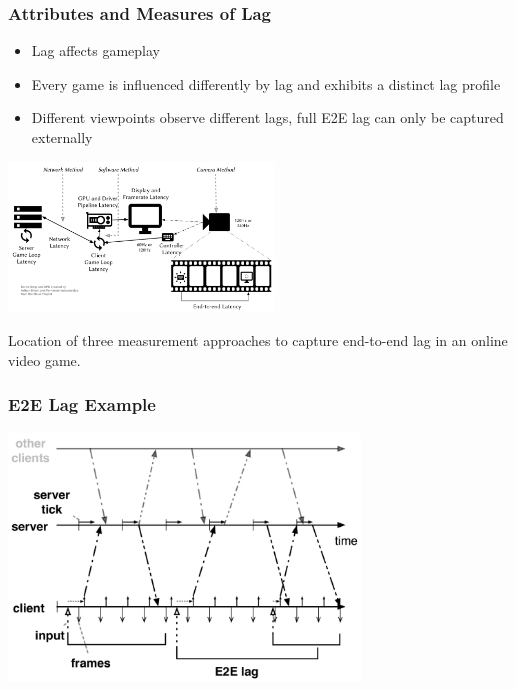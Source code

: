 \documentclass{UDEbeamerEN}
\begin{document}
\begin{frame}
	\frametitle{Attributes and Measures of Lag}

	\begin{itemize}
		\item Lag affects gameplay
		\item Every game is influenced differently by lag and exhibits a distinct lag profile
		\item Different viewpoints observe different lags, full E2E lag can only be captured externally
	\end{itemize}

	\begin{center}
		\includegraphics[height=4cm]{../../../models/e2e-lag.pdf}

	    Location of three measurement approaches to capture end-to-end lag in an online video game.
	\end{center}

\end{frame}

\begin{frame}
	\frametitle{E2E Lag Example}

	\begin{center}
		\includegraphics[width=0.7\textwidth]{../../../models/tickrate-timeseries-poster.pdf}
	\end{center}

\end{frame}
\end{document}
